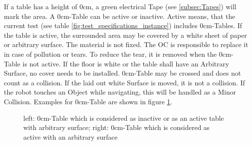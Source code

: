 If a table has a height of $0\si{\centi\meter}$, a green electrical Tape (see \ref{subsec:Tapes}) will mark the area. A $0\si{\centi\meter}$-Table can be active or inactive. Active means, that the current test (see table \ref{fig:test_specifications_instance}) includes $0\si{\centi\meter}$-Tables.
If the table is active, the surrounded area may be covered by a white sheet of paper or arbitrary surface. The material is not fixed.
The OC is responsible to replace it in case of pollution or tears. To reduce the tear, it is removed when the $0\si{\centi\meter}$-Table is not active. If the floor is white or the table shall have an Arbitrary Surface, no cover needs to be installed.
$0\si{\centi\meter}$-Table may be crossed and does not count as a collision. If the laid out white Surface is moved, it is not a collision.
If the robot touches an Object while navigating, this will be handled as a Minor Collision. Examples for $0\si{\centi\meter}$-Table are shown in figure \ref{fig:0cmws}.



\begin{figure} [h!]
		\begin{center}
			 \hspace{0.2cm}
		\end{center}
	\caption{left: $0\si{\centi\meter}$-Table which is considered as inactive or as an active table with arbitrary surface; right: $0\si{\centi\meter}$-Table which is considered as active with an arbitrary surface}
	\label{fig:0cmws}
\end{figure}

